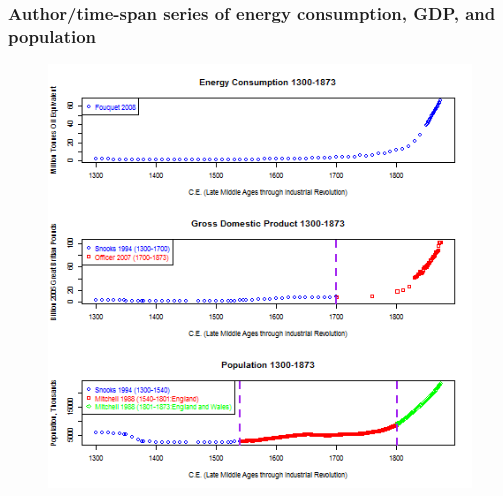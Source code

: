 \documentclass[final]{beamer}
\begin{document}
\begin{frame}
\frametitle{Author/time-span series of energy consumption, GDP, and population}
\begin{figure}[p!]
\center
\label{fig:overall levels}
\includegraphics[height=0.8\textheight]{overallLevels}
\end{figure}
\end{frame}
\end{document}
